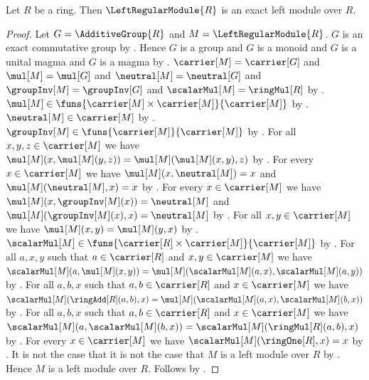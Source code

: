 \begin{theorem}\label{left_regular_module_is_exact}
    Let $R$ be a ring.
    Then $\LeftRegularModule{R}$ is an exact left module over $R$.
\end{theorem}
\begin{proof}
    Let $G=\AdditiveGroup{R}$ and $M=\LeftRegularModule{R}$.
    $G$ is an exact commutative group by
        .
    Hence $G$ is a group and $G$ is a monoid and
        $G$ is a unital magma and $G$ is a magma by
        .
    $\carrier[M]=\carrier[G]$ and $\mul[M]=\mul[G]$ and
        $\neutral[M]=\neutral[G]$ and
        $\groupInv[M]=\groupInv[G]$ and
        $\scalarMul[M]=\ringMul[R]$ by
        .
    $\mul[M]\in
        \funs{\carrier[M]\times\carrier[M]}{\carrier[M]}$ by
        .
    $\neutral[M]\in\carrier[M]$ by .
    $\groupInv[M]\in\funs{\carrier[M]}{\carrier[M]}$ by
        .
    For all $x,y,z\in\carrier[M]$ we have
        $\mul[M](x,\mul[M](y,z))=\mul[M](\mul[M](x,y),z)$ by
        .
    For every $x\in\carrier[M]$ we have
        $\mul[M](x,\neutral[M])=x$ and
        $\mul[M](\neutral[M],x)=x$ by
        .
    For every $x\in\carrier[M]$ we have
        $\mul[M](x,\groupInv[M](x))=\neutral[M]$ and
        $\mul[M](\groupInv[M](x),x)=\neutral[M]$ by
        .
    For all $x,y\in\carrier[M]$ we have
        $\mul[M](x,y)=\mul[M](y,x)$ by
        .
    $\scalarMul[M]\in
        \funs{\carrier[R]\times\carrier[M]}{\carrier[M]}$ by
        .
    For all $a,x,y$ such that
        $a\in\carrier[R]$ and $x,y\in\carrier[M]$ we have
        $\scalarMul[M](a,\mul[M](x,y))
            =\mul[M](\scalarMul[M](a,x),\scalarMul[M](a,y))$ by
        .
    For all $a,b,x$ such that
        $a,b\in\carrier[R]$ and $x\in\carrier[M]$ we have
        $\scalarMul[M](\ringAdd[R](a,b),x)
            =\mul[M](\scalarMul[M](a,x),\scalarMul[M](b,x))$ by
        .
    For all $a,b,x$ such that
        $a,b\in\carrier[R]$ and $x\in\carrier[M]$ we have
        $\scalarMul[M](a,\scalarMul[M](b,x))
            =\scalarMul[M](\ringMul[R](a,b),x)$ by
        .
    For every $x\in\carrier[M]$ we have
        $\scalarMul[M](\ringOne[R],x)=x$ by
        .
    It is not the case that it is not the case that
        $M$ is a left module over $R$ by
        .
    Hence $M$ is a left module over $R$.
    Follows by
        .
\end{proof}

